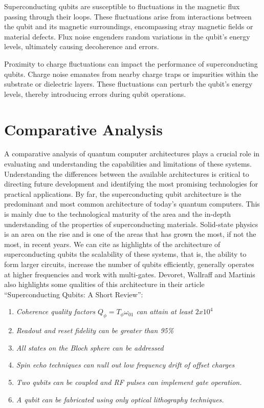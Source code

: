 \documentclass[
  journal=largetwo,
  year=2023,
]{cup-journal}
\begin{document}
Superconducting qubits are susceptible to fluctuations in the magnetic flux passing through their loops. These fluctuations arise from interactions between the qubit and its magnetic surroundings, encompassing stray magnetic fields or material defects. Flux noise engenders random variations in the qubit's energy levels, ultimately causing decoherence and errors.

Proximity to charge fluctuations can impact the performance of superconducting qubits. Charge noise emanates from nearby charge traps or impurities within the substrate or dielectric layers. These fluctuations can perturb the qubit's energy levels, thereby introducing errors during qubit operations.

\section{Comparative Analysis}
\label{sec:comparative}

A comparative analysis of quantum computer architectures plays a crucial role in evaluating and understanding the capabilities and limitations of these systems. Understanding the differences between the available architectures is critical to directing future development and identifying the most promising technologies for practical applications. By far, the superconducting qubit architecture is the predominant and most common architecture of today's quantum computers. This is mainly due to the technological maturity of the area and the in-depth understanding of the properties of superconducting materials. Solid-state physics is an area on the rise and is one of the areas that has grown the most, if not the most, in recent years. We can cite as highlights of the architecture of superconducting qubits the scalability of these systems, that is, the ability to form larger circuits, increase the number of qubits efficiently, generally operates at higher frequencies and work with multi-gates. Devoret, Wallraff and Martinis also highlights some qualities of this architecture in their article ``Superconducting Qubits: A Short Review'':~\autocite{devoret_2004_superconducting}

\begin{enumerate}
  \item \emph{Coherence quality factors \(Q_\phi = T_\phi\omega_{01}\) can attain at least \(2x10^4\) }
  \item \emph{Readout and reset fidelity can be greater than 95\%}
  \item \emph{All states on the Bloch sphere can be addressed}
  \item \emph{ Spin echo techniques can null out low frequency drift of offset charges}
  \item \emph{Two qubits can be coupled and RF pulses can implement gate operation.}
  \item \emph{A qubit can be fabricated using only optical lithography techniques.}
\end{enumerate}
\end{document}
